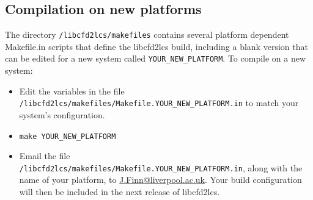 \documentclass[letterpaper,11pt]{article}
\begin{document}
\subsection*{Compilation on new platforms}
The directory \verb|/libcfd2lcs/makefiles| contains several platform dependent Makefile.in scripts that define the libcfd2lcs build, including a blank version that can be edited for a new system called \verb|YOUR_NEW_PLATFORM|.  To compile on a new system: 
\begin{itemize}
 \item Edit the variables in the file \verb|/libcfd2lcs/makefiles/Makefile.YOUR_NEW_PLATFORM.in| to match your system's configuration.
 \item \verb|make YOUR_NEW_PLATFORM|
 \item Email the file\\ \verb|/libcfd2lcs/makefiles/Makefile.YOUR_NEW_PLATFORM.in|, along with the name of your platform, to \href{mailto:J.Finn@liverpool.ac.uk}{J.Finn@liverpool.ac.uk}.  Your build configuration will then be included in the next release of libcfd2lcs.
\end{itemize}
\end{document}
